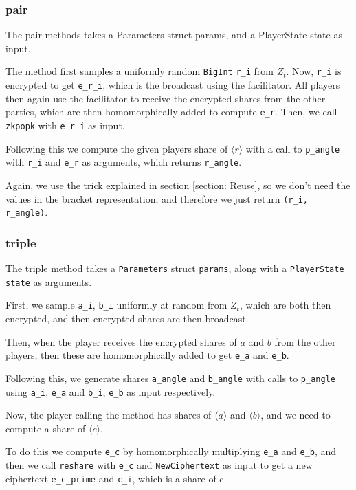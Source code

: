\documentclass[../main.tex]{subfiles}
\begin{document}
\subsubsection{pair}
The pair methods takes a Parameters struct params, and a PlayerState state as input.

The method first samples a uniformly random \lstinline{BigInt} \lstinline{r_i} from $Z_t$. Now, \lstinline{r_i} is encrypted to get \lstinline{e_r_i}, which is the broadcast using the facilitator. All players then again use the facilitator to receive the encrypted shares from the other parties, which are then homomorphically added to compute \lstinline{e_r}. Then, we call \lstinline{zkpopk} with \lstinline{e_r_i} as input.

Following this we compute the given players share of $\langle r \rangle$ with a call to \lstinline{p_angle} with \lstinline{r_i} and \lstinline{e_r} as arguments, which returns \lstinline{r_angle}.

Again, we use the trick explained in section \ref{section: Reuse}, so we don't need the values in the bracket representation, and therefore we just return \lstinline{(r_i, r_angle)}.

\subsubsection{triple}
The triple method takes a \lstinline{Parameters} struct \lstinline{params}, along with a \lstinline{PlayerState} \lstinline{state} as arguments.

First, we sample \lstinline{a_i}, \lstinline{b_i} uniformly at random from $Z_t$, which are both then encrypted, and then encrypted shares are then broadcast.

Then, when the player receives the encrypted shares of $a$ and $b$ from the other players, then these are homomorphically added to get \lstinline{e_a} and \lstinline{e_b}.

Following this, we generate shares \lstinline{a_angle} and \lstinline{b_angle} with calls to \lstinline{p_angle} using \lstinline{a_i}, \lstinline{e_a} and \lstinline{b_i}, \lstinline{e_b} as input respectively.

Now, the player calling the method has shares of $\langle a \rangle$ and $\langle b \rangle$, and we need to compute a share of $\langle c \rangle$.

To do this we compute \lstinline{e_c} by homomorphically multiplying \lstinline{e_a} and \lstinline{e_b}, and then we call \lstinline{reshare} with \lstinline{e_c} and \lstinline{NewCiphertext} as input to get a new ciphertext \lstinline{e_c_prime} and \lstinline{c_i}, which is a share of c. 
\end{document}
